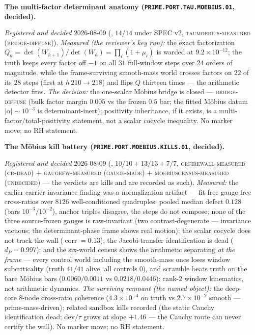 \par\smallskip\noindent\textbf{The multi-factor determinant
anatomy (\texttt{PRIME.PORT.TAU.\allowbreak MOEBIUS.01},
decided).}
{\sloppy
\emph{Registered and decided} 2026-08-09
(, $14/14$ under SPEC
v2, \textsc{taumoebius-measured (bridge-diffuse)}).
\emph{Measured (the reviewer's key run):} the exact
factorization $Q_h = \det(W_{h+1})/\det(W_h) = \prod_i (1 +
\mu_i)$ is warded at $9.2\times10^{-12}$; the truth keeps every
factor off $-1$ on all $31$ full-window steps over $24$ orders
of magnitude, while the frame-surviving smooth-mass world
crosses factors on $22$ of its $28$ steps (first at $h\,210 \to
218$) and flips $Q$ thirteen times --- the arithmetic detector
fires.  \emph{The decision:} the one-scalar M\"obius bridge is
closed --- \textsc{bridge-diffuse} (bulk factor margin $0.005$
vs the frozen $0.5$ bar; the fitted M\"obius datum $|\alpha|
\sim 10^{-3}$ is determinant-inert); positivity inheritance, if
it exists, is a multi-factor/total-positivity statement, not a
scalar cocycle inequality.  No marker move; no RH
statement.\par}


\par\smallskip\noindent\textbf{The M\"obius kill battery
(\texttt{PRIME.PORT.MOEBIUS.\allowbreak KILLS.01}, decided).}
{\sloppy
\emph{Registered and decided} 2026-08-09
(, $10/10 + 13/13 +
7/7$, \textsc{crfirewall-measured (cr-dead)} $+$
\textsc{gaugefw-measured (gauge-made)} $+$
\textsc{moebiuscensus-measured (undecided)} --- the verdicts
are kills and are recorded as such).  \emph{Measured:} the
earlier carrier-invariance finding was a normalization artifact
--- fit-free gauge-free cross-ratios over $8126$
well-conditioned quadruples: pooled median defect $0.128$
(bars $10^{-3}/10^{-2}$), anchor triples disagree, the steps do
not compose; none of the three source-frozen gauges is
raw-invariant (two contrast-degenerate --- invariance vacuous;
the determinant-phase frame shows real motion); the scalar
cocycle does not track the wall ($\operatorname{corr} =
0.13$); the Jacobi-transfer identification is dead ($d_P =
0.997$); and the six-world census shows the arithmetic
separating \emph{at the frame} --- every control world
including the smooth-mass ones loses window subcriticality
(truth $41/41$ alive, all controls $0$), and scramble beats
truth on the bare M\"obius bars ($0.0060/0.0011$ vs
$0.0218/0.0446$): rank-2 window kinematics, not arithmetic
dynamics.  \emph{The surviving remnant (the named object):} the
deep-core $8$-node cross-ratio coherence ($4.3\times10^{-4}$ on
truth vs $2.7\times10^{-2}$ smooth --- prime-mass-driven);
related sandbox kills recorded (the static Cauchy
identification dead; $\mathrm{dev}/\tau$ grows at slope
$+1.46$ --- the Cauchy route can never certify the wall).  No
marker move; no RH statement.\par}


